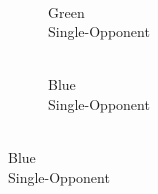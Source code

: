 \documentclass[journal,onecolumn]{IEEEtran}
\begin{document}
\begin{figure}[h]
\begin{subfigure}{0.15\textwidth}
    \end{subfigure}
    \begin{subfigure}{0.15\textwidth}
        \centering
        \captionsetup{justification=centering}
        \caption{\\ Green\\ Single-Opponent}
    \end{subfigure}
    \begin{subfigure}{0.15\textwidth}
        \centering
        \captionsetup{justification=centering}
        \caption{\\ Blue\\ Single-Opponent}

\end{subfigure}
\end{figure}
\end{document}
